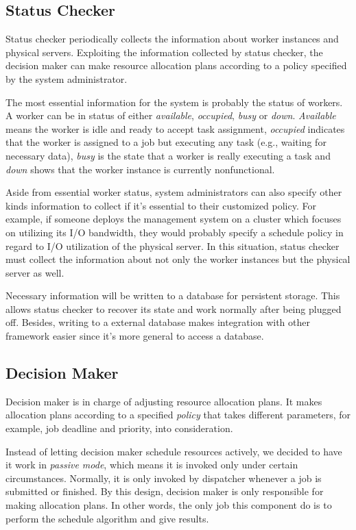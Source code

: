 \subsection{Status Checker}

Status checker periodically collects the information about worker
instances and physical servers.
Exploiting the information collected by status checker, the decision
maker can make resource allocation plans according to a policy specified
by the system administrator.

The most essential information for the system is probably the status of
workers.
A worker can be in status of either \emph{available}, \emph{occupied},
\emph{busy} or \emph{down}.
\emph{Available} means the worker is idle and ready to accept task
assignment, \emph{occupied} indicates that the worker is assigned to a
job but executing any task (e.g., waiting for necessary data), \emph{
busy} is the state that a worker is really executing a task and \emph{down}
shows that the worker instance is currently nonfunctional. 

Aside from essential worker status, system administrators can also
specify other kinds information to collect if it's essential to  their
customized policy.
For example, if someone deploys the management system on a cluster which
focuses on utilizing its I/O bandwidth, they would probably specify a
schedule policy in regard to I/O utilization of the physical server.
In this situation, status checker must collect the information about not
only the worker instances but the physical server as well.

Necessary information will be written to a database for persistent
storage.
This allows status checker to recover its state and work normally after
being plugged off.
Besides, writing to a external database makes integration with other
framework easier since it's more general to access a database.

\subsection{Decision Maker}

Decision maker is in charge of adjusting resource allocation plans.
It makes allocation plans according to a specified \emph{policy} that
takes different parameters, for example, job deadline and priority, into
consideration. 

Instead of letting decision maker schedule resources actively, we
decided to have it work in \emph{passive mode}, which means it is
invoked only under certain circumstances.
Normally, it is only invoked by dispatcher whenever a job is submitted
or finished.
By this design, decision maker is only responsible for making allocation
plans.
In other words, the only job this component do is to perform the
schedule algorithm and give results.

